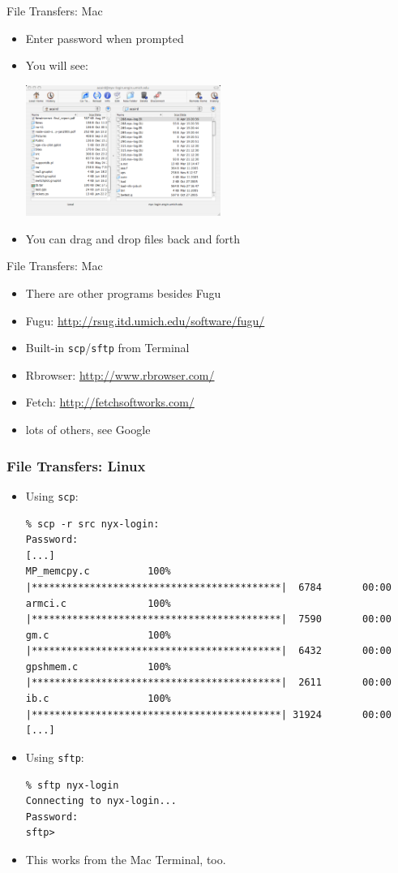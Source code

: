 \documentclass{beamer}
\begin{document}
  \begin{frame}{File Transfers: Mac}
    \begin{itemize}
    \item Enter password when prompted
    \item You will see: \\
      \begin{center}\includegraphics[width=2.5in]{ssh-fugu-connected}\end{center}
    \item You can drag and drop files back and forth
    \end{itemize}
  \end{frame}
  \begin{frame}{File Transfers: Mac}
    \begin{itemize}
    \item There are other programs besides Fugu
    \item Fugu: \url{http://rsug.itd.umich.edu/software/fugu/}
    \item Built-in \texttt{scp}/\texttt{sftp} from Terminal
    \item Rbrowser: \url{http://www.rbrowser.com/}
    \item Fetch: \url{http://fetchsoftworks.com/}
    \item lots of others, see Google
    \end{itemize}
  \end{frame}
\begin{frame}[fragile]
    \frametitle{File Transfers: Linux}
    \begin{itemize}
    \item Using \texttt{scp}:\\
      \tiny
\begin{verbatim}
% scp -r src nyx-login:
Password:
[...]
MP_memcpy.c          100% |*******************************************|  6784       00:00
armci.c              100% |*******************************************|  7590       00:00
gm.c                 100% |*******************************************|  6432       00:00
gpshmem.c            100% |*******************************************|  2611       00:00
ib.c                 100% |*******************************************| 31924       00:00
[...]
\end{verbatim}
      \normalsize
    \item Using \texttt{sftp}:\\
      \tiny
\begin{verbatim}
% sftp nyx-login
Connecting to nyx-login...
Password: 
sftp> 
\end{verbatim}
      \normalsize
    \item This works from the Mac Terminal, too.
    \end{itemize}
\end{frame}
\end{document}
